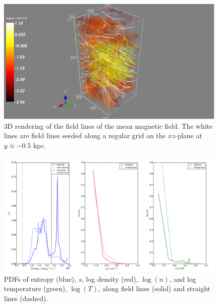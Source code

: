 \documentclass[useAMS,usenatbib]{mn2e}
\begin{document}
\begin{figure}
  \vspace{0cm}
  \centering
\hspace*{0cm} \includegraphics[width=\linewidth]{snapshot1.png}
\hspace*{0cm} \caption{3D rendering of the field lines of the mean magnetic field. The white lines are field lines seeded along a regular grid on the $xz$-plane at $y\approx-0.5$ kpc. 
  \label{fig:fld_lines}}
  \end{figure}
\begin{figure}
\centering
\includegraphics[width=\linewidth]{sline_vs_fld1.pdf}
\caption{PDFs of entropy (blue), $s$, log density (red), $\log(n)$, and log temperature (green), $\log(T)$, along field lines (solid) and straight lines (dashed).}
\label{fig:pdfs_mean}
\end{figure}
\end{document}
